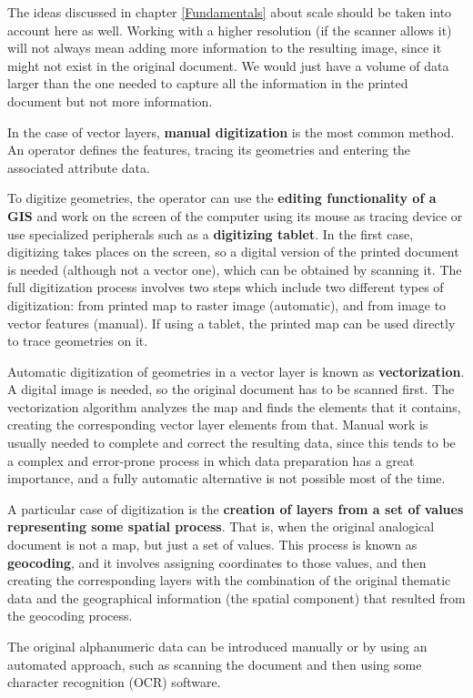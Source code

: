 The ideas discussed in chapter \ref{Fundamentals} about scale should be taken into account here as well. Working with a higher resolution (if the scanner allows it) will not always mean adding more information to the resulting image, since it might not exist in the original document. We would just have a volume of data larger than the one needed to capture all the information in the printed document but not more information.

In the case of vector layers, \textbf{manual digitization} is the most common method. An operator defines the features, tracing its geometries and entering the associated attribute data.

To digitize geometries, the operator can use the \textbf{editing functionality of a GIS} and work on the screen of the computer using its mouse as tracing device or use specialized peripherals such as a \textbf{digitizing tablet}. In the first case, digitizing takes places on the screen, so a digital version of the printed document is needed (although not a vector one), which can be obtained by scanning it. The full digitization process involves two steps which include two different types of digitization: from printed map to raster image (automatic), and from image to vector features (manual). If using a tablet, the printed map can be used directly to trace geometries on it.

Automatic digitization of geometries in a vector layer is known as \textbf{vectorization}. A digital image is needed, so the original document has to be scanned first. The vectorization algorithm analyzes the map and finds the elements that it contains, creating the corresponding vector layer elements from that. Manual work is usually needed to complete and correct the resulting data, since this tends to be a complex and error-prone process in which data preparation has a great importance, and a fully automatic alternative is not possible most of the time.

A particular case of digitization is the \textbf{creation of layers from a set of values representing some spatial process}. That is, when the original analogical document is not a map, but just a set of values. This process is known as \textbf{geocoding}, and it involves assigning coordinates to those values, and then creating the corresponding layers with the combination of the original thematic data and the geographical information (the spatial component) that resulted from the geocoding process.

The original alphanumeric data can be introduced manually or by using an automated approach, such as scanning the document and then using some character recognition (OCR) software.

